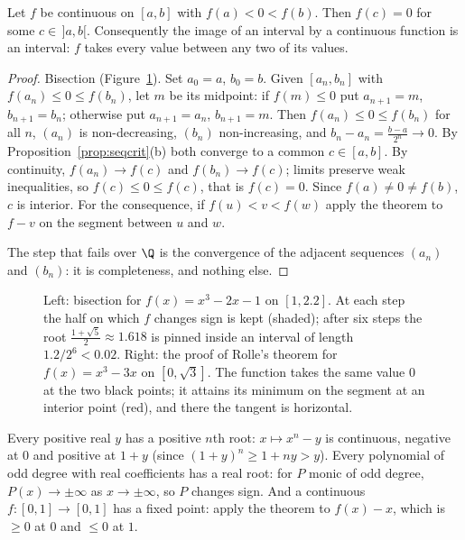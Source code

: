 \begin{theorem}\label{thm:ivt}
Let $f$ be continuous on $[a,b]$ with $f(a)<0<f(b)$. Then $f(c)=0$ for some $c\in\,]a,b[$. Consequently the image of an interval by a continuous function
is an interval: $f$ takes every value between any two of its values.
\end{theorem}
\begin{proof}
Bisection (Figure~\ref{fig:bisection}). Set $a_0=a$, $b_0=b$. Given $[a_n,b_n]$ with $f(a_n)\le0\le f(b_n)$, let $m$ be its midpoint: if $f(m)\le0$ put $a_{n+1}=m$, $b_{n+1}=b_n$; otherwise
put $a_{n+1}=a_n$, $b_{n+1}=m$. Then $f(a_n)\le0\le f(b_n)$ for all $n$, $(a_n)$ is non-decreasing, $(b_n)$ non-increasing, and $b_n-a_n=\frac{b-a}{2^n}\to0$.
By Proposition~\ref{prop:seqcrit}(b) both converge to a common $c\in[a,b]$. By continuity, $f(a_n)\to f(c)$ and $f(b_n)\to f(c)$; limits preserve weak
inequalities, so $f(c)\le0\le f(c)$, that is $f(c)=0$. Since $f(a)\ne0\ne f(b)$, $c$ is interior. For the consequence, if $f(u)<v<f(w)$ apply the
theorem to $f-v$ on the segment between $u$ and $w$.

The step that fails over $\Q$ is the convergence of the adjacent sequences $(a_n)$ and $(b_n)$: it is completeness, and nothing else.
\end{proof}

\begin{figure}[ht]
\centering
{}
\caption{Left: bisection for $f(x)=x^3-2x-1$ on $[1,2.2]$. At each step the half on which $f$ changes sign is kept (shaded); after six steps the root $\frac{1+\sqrt5}2\approx1.618$ is pinned inside an interval of length $1.2/2^6<0.02$. Right: the proof of Rolle's theorem for $f(x)=x^3-3x$ on $[0,\sqrt3]$. The function takes the same value $0$ at the two black points; it attains its minimum on the segment at an interior point (red), and there the tangent is horizontal.}
\label{fig:bisection}
\end{figure}

\begin{examplex}
Every positive real $y$ has a positive $n$th root: $x\mapsto x^n-y$ is continuous, negative at $0$ and positive at $1+y$ (since $(1+y)^n\ge1+ny>y$).
Every polynomial of odd degree with real coefficients has a real root: for $P$ monic of odd degree, $P(x)\to\pm\infty$ as $x\to\pm\infty$, so $P$
changes sign. And a continuous $f:[0,1]\to[0,1]$ has a fixed point: apply the theorem to $f(x)-x$, which is $\ge0$ at $0$ and $\le0$ at $1$.
\end{examplex}

